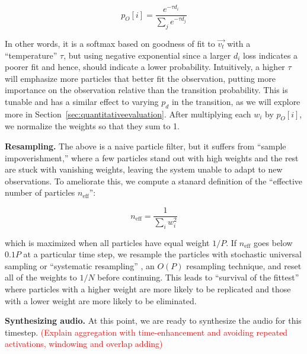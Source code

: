 \documentclass{article}
\newcommand{\ChrisEdit}[1]{\textcolor{red}{(#1)}}
\begin{document}
\begin{equation}
    \label{eq:observationprob}
    p_O[i] = \frac{e^{-\tau d_i}}{ \sum_{j} e^{-\tau d_j}}
\end{equation}

In other words, it is a softmax based on goodness of fit to $\vec{v_t}$ with a ``temperature'' $\tau$, but using negative exponential since a larger $d_i$ loss indicates a poorer fit and hence, should indicate a lower probability.  Intuitively, a higher $\tau$ will emphasize more particles that better fit the observation, putting more importance on the observation relative than the transition probability.  This is tunable and has a similar effect to varying $p_d$ in the transition, as we will explore more in Section~\ref{sec:quantitativeevaluation}.  After multiplying each $w_i$ by $p_O[i]$, we normalize the weights so that they sum to 1.  

\textbf{Resampling.} The above is a naive particle filter, but it suffers from ``sample impoverishment,'' where a few particles stand out with high weights and the rest are stuck with vanishing weights, leaving the system unable to adapt to new observations.  To ameliorate this, we compute a stanard definition of the ``effective number of particles $n_{\text{eff}}$'':

\begin{equation}
    n_{\text{eff}} = \frac{1}{\sum_{i} w_i^2}
\end{equation}


which is maximized when all particles have equal weight $1/P$.  If $n_{\text{eff}}$ goes below $0.1P$ at a particular time step, we resample the particles with stochastic universal sampling or ``systematic resampling'' \cite{kitagawa1996monte, carpenter1999improved}, an $O(P)$ resampling technique, and reset all of the weights to $1/N$ before continuing.  This leads to ``survival of the fittest'' where particles with a higher weight are more likely to be replicated and those with a lower weight are more likely to be eliminated.

\textbf{Synthesizing audio.} At this point, we are ready to synthesize the audio for this timestep. \ChrisEdit{Explain aggregation with time-enhancement and avoiding repeated activations, windowing and overlap adding}


\end{document}
